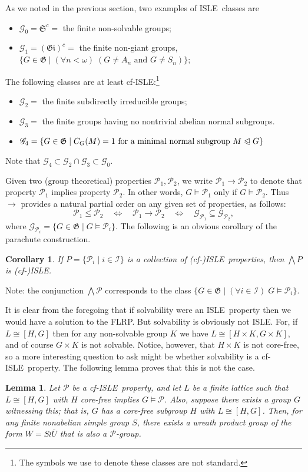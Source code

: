 \documentclass[cm,dissertation,actual,final]{uhthesis}
\theoremstyle{plain}
\newtheorem{corollary}[theorem]{Corollary}
\newtheorem{lemma}[theorem]{Lemma}
\theoremstyle{definition}
\theoremstyle{remark}
\numberwithin{theorem}{section}
\numberwithin{claim}{chapter}
\numberwithin{equation}{section}
\numberwithin{conjecture}{chapter}
\newcommand{\<}{\ensuremath{\langle}}
\renewcommand{\>}{\ensuremath{\rangle}}
\renewcommand{\leq}{\ensuremath{\leqslant}}
\newcommand{\subnormal}{\ensuremath{\trianglelefteqslant}}
\newcommand{\Meet}{\ensuremath{\bigwedge}}
\newcommand{\FLRP}{{\small FLRP}}
\newcommand{\0}{\ensuremath{\mathbf{0}}}
\newcommand{\1}{\ensuremath{\mathbf{1}}}
\newcommand{\2}{\ensuremath{\mathbf{2}}}
\newcommand{\3}{\ensuremath{\mathbf{3}}}
\newcommand{\4}{\ensuremath{\mathbf{4}}}
\newcommand{\5}{\ensuremath{\mathbf{5}}}
\newcommand{\sG}{\ensuremath{\mathscr{G}}}
\newcommand{\G}{\ensuremath{\mathfrak{G}}}
\newcommand{\sI}{\ensuremath{\mathscr{I}}}
\newcommand{\cP}{\ensuremath{\mathcal{P}}}
\renewcommand{\iff}{\ensuremath{\quad \Leftrightarrow \quad}}
\newcommand{\ISLE}{{\small ISLE}}
\begin{document}
As we noted in the previous section, two examples of \ISLE\ classes are
\begin{itemize}
\item $\sG_0 = \mathfrak{S}^c = $ the finite non-solvable groups;
\item $\sG_1 =(\mathfrak{Gi})^c = $ the finite non-giant groups, 
$\{G\in \G \mid (\forall n<\omega) \; (G \neq A_n \text{ and }  G\neq S_n) \}$;
\end{itemize}
The following classes are at least cf-\ISLE:\footnote{The symbols we use to denote these classes are not standard.}
\begin{itemize}
\item $\sG_2 = $ the finite subdirectly irreducible groups;
\item $\sG_3 = $ the finite groups having no nontrivial abelian normal subgroups.
\item $\sG_4 = \{G\in \G \mid C_G(M) = 1 \text{ for a minimal normal
  subgroup } M\subnormal G\}$
\end{itemize}
Note that $\sG_4 \subset \sG_2\cap \sG_3 \subset \sG_0$.

Given two (group theoretical) properties $\cP_1, \cP_2$, we write
$\cP_1 \rightarrow \cP_2$ to denote that property 
$\cP_1$ implies property $\cP_2$. In other words,
$G\vDash \cP_1$ only if $G\vDash \cP_2$.
Thus $\rightarrow$ provides a natural partial order on any given set of 
properties, as follows:
\[
\cP_1 \leq \cP_2  \iff \cP_1 \rightarrow \cP_2 \iff \sG_{\cP_1}\subseteq
\sG_{\cP_2},
\]
where $\sG_{\cP_i} = \{G\in \G \mid G\vDash \cP_i\}$.
The following is an obvious corollary of the parachute construction. %
\begin{corollary}
\label{cor:isle-prop-groups-1}
  If $P = \{\cP_i \mid i\in \sI\}$ is a collection of (cf-)\ISLE\ properties,
  then $\Meet P$ is (cf-)\ISLE.
\end{corollary}
Note: the conjunction $\Meet \cP$ corresponds to the class $\{G \in \G \mid (\forall i \in \sI) \; G\vDash \cP_i \}$.

It is clear from the foregoing that if solvability were an \ISLE\ property then
we would have a solution to the \FLRP.  But solvability is obviously not \ISLE.
For, if $L\cong [H, G]$ then for any non-solvable group $K$ we have $L\cong
[H\times K, G\times K]$, and of course $G\times K$ is not solvable.  
Notice, however, that $H\times K$ is not core-free, so a more interesting
question to ask might be whether solvability is a cf-\ISLE\ property. 
The following lemma proves that this is not the case.  
\begin{lemma}
  \label{lem:ISLE-must-have-wreaths}
Let $\cP$ be a cf-\ISLE\ property, and let $L$ be a finite lattice such that 
$L\cong [H,G]$ with $H$ core-free implies $G\vDash \cP$.  Also, suppose there
exists a group $G$ witnessing this; that is, $G$ has a core-free subgroup
$H$ with $L\cong [H,G]$.   
Then, for any finite nonabelian simple group $S$, there exists a wreath product group
of the form $W = S\wr \bar{U}$ that is also a $\cP$-group.
\end{lemma}
\end{document}
